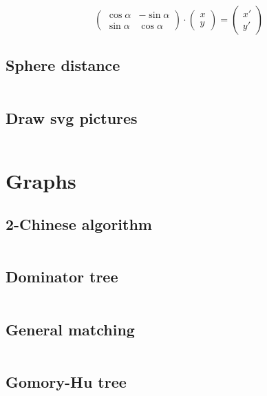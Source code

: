 \documentclass{article}
\begin{document}
$$
\begin{pmatrix}
\cos \alpha & -\sin \alpha \\
\sin \alpha & \cos \alpha
\end{pmatrix}
\cdot
\begin{pmatrix}
x \\
y
\end{pmatrix}
=
\begin{pmatrix}
x' \\
y'
\end{pmatrix}
$$
\subsection{Sphere distance}
\inputminted[mathescape, breaklines, breakafter=(, tabsize=2, frame=lines, showtabs, tab=|\ , tabcolor=lightgray]{c++}{./geometry/sphere-dist/sphere-dist.cpp}
\subsection{Draw svg pictures}
\inputminted[mathescape, breaklines, breakafter=(, tabsize=2, frame=lines, showtabs, tab=|\ , tabcolor=lightgray]{c++}{./geometry/svg-draw/svg-draw.cpp}
\section{Graphs}
\subsection{2-Chinese algorithm}
\inputminted[mathescape, breaklines, breakafter=(, tabsize=2, frame=lines, showtabs, tab=|\ , tabcolor=lightgray]{c++}{./graphs/2-chinese/2-chinese.cpp}
\subsection{Dominator tree}
\inputminted[mathescape, breaklines, breakafter=(, tabsize=2, frame=lines, showtabs, tab=|\ , tabcolor=lightgray]{c++}{./graphs/dominator-tree/dominator-tree.cpp}
\subsection{General matching}
\inputminted[mathescape, breaklines, breakafter=(, tabsize=2, frame=lines, showtabs, tab=|\ , tabcolor=lightgray]{c++}{./graphs/general-matching/general-matching.cpp}
\subsection{Gomory-Hu tree}
\inputminted[mathescape, breaklines, breakafter=(, tabsize=2, frame=lines, showtabs, tab=|\ , tabcolor=lightgray]{c++}{./graphs/gomory-hu/gomory-hu.cpp}
\end{document}
